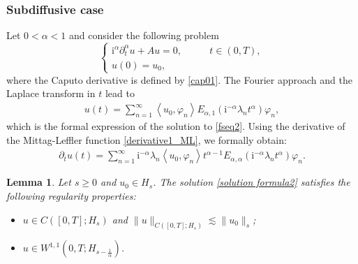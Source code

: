 \documentclass[reqno]{amsart}
\newtheorem{lem}[theorem]{Lemma}
\numberwithin{equation}{section}
\begin{document}
\subsubsection{Subdiffusive case}
Let $0<\alpha<1$ and consider the following problem
\begin{equation}\label{fseq2}
\begin{cases}
\mathrm{i}^{\alpha}\partial_t^\alpha u +Au=0, &\qquad t \in (0,T),\\
u(0)=u_0,
\end{cases}
\end{equation}
where the Caputo derivative is defined by \eqref{cap01}. The Fourier approach and the Laplace transform in $t$ lead to
	\begin{align}\label{solution formula2}
		u(t)=\sum_{n=1}^{\infty}\left\langle u_0, \varphi_n\right\rangle E_{\alpha, 1}\left(\mathrm{i}^{-\alpha}\lambda_n t^\alpha\right) \varphi_n,
	\end{align}
which is the formal expression of the solution to \eqref{fseq2}. Using the derivative of the Mittag-Leffler function \eqref{derivative1_ML}, we formally obtain:
\begin{align}\label{derivative}
	\partial_t u(t)=\sum_{n=1}^{\infty}\mathrm{i}^{-\alpha}\lambda_n\left\langle u_0, \varphi_n\right\rangle t^{\alpha-1}E_{\alpha, \alpha}\left(\mathrm{i}^{-\alpha}\lambda_n t^\alpha\right) \varphi_n.
\end{align}
\begin{lem} \label{regularity2}
	Let $s\geq 0$ and $u_0\in H_s$. The solution \eqref{solution formula2} satisfies the following regularity properties:
	\begin{itemize}
		\item[(i)] $u\in C([0,T];H_s)$ and $\|u\|_{C([0,T];H_s)}\lesssim \|u_0\|_s$;
		\item[(ii)] $u\in W^{1,1}\left(0,T; H_{s-\frac{1}{\alpha}}\right)$.
	\end{itemize}
\end{lem}
\end{document}
